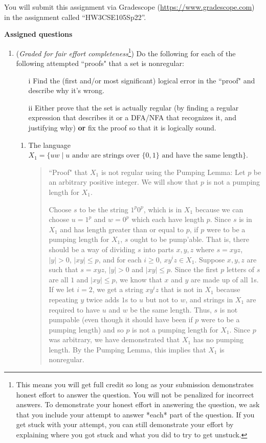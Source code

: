 \instructions

You will submit this assignment via Gradescope
(\href{https://www.gradescope.com}{https://www.gradescope.com}) 
in the assignment called ``HW3CSE105Sp22''.

\newpage
{\bf Assigned questions}
\begin{enumerate}
\item ({\it Graded for fair effort completeness}\footnote{This means 
you will get full credit so long as your submission demonstrates honest 
effort to answer the question. You will not be penalized for incorrect answers. 
To demonstrate your honest effort in answering the question, we ask that you 
include your attempt to answer *each* part of the question. If you get stuck 
with your attempt, you can still demonstrate your effort by explaining where 
you got stuck and what you did to try to get unstuck.})
Do the following for each of the following attempted ``proofs" that  a set is nonregular:
\begin{itemize}
\item[i] Find the (first and/or most significant) logical error in the ``proof" and describe why it's wrong.
\item[ii] Either prove that the set is actually regular (by finding a regular expression that describes it or 
a DFA/NFA that recognizes it, and justifying why) {\bf or} fix the proof so that it is logically sound.
\end{itemize}

\begin{enumerate}
\item The language $X_1 = \{ uw \mid \text{$u$ and
$w$ are strings over $\{0,1\}$ and have the same length} \}$.

\begin{quote}
``Proof" that $X_1$ is not regular using the Pumping Lemma: Let $p$ be 
an arbitrary positive integer. We will show that $p$ is not a pumping length for $X_1$. 

Choose $s$ to be the string $1^p 0^p$, which is in $X_1$ because
we can choose $u = 1^p$ and $w = 0^p$ which each have length $p$.
Since $s$ is in $X_1$ and has length greater than or equal to $p$, if $p$ were to be a
pumping length for $X_1$, $s$ ought to be pump'able. 
That is, there should be a way of dividing $s$ into parts $x,y,z$ where $s=xyz$,
$|y| >0$, $|xy| \leq p$, and for each $i \geq 0$, $xy^iz \in X_1$.
Suppose $x,y,z$ are such that $s = xyz$, $|y| > 0$ and $|xy| \leq p$.
Since the first $p$ letters of $s$ are all $1$ and $|xy| \leq p$, we know
that $x$ and $y$ are made up of all $1$s.  If we let $i=2$, we get 
a string $xy^iz$ that is not in $X_1$ because repeating $y$ twice adds $1$s to 
$u$ but not to $w$, and strings in $X_1$ are required to have $u$ and $w$ be the same
length. Thus, $s$ is not pumpable (even though it should have been if $p$ were to be a pumping length)
and so $p$ is not a pumping length for $X_1$.  Since $p$ was arbitrary, we have
demonstrated that $X_1$ has no pumping length.  By the Pumping Lemma, this implies that 
$X_1$ is nonregular.
\end{quote}



\end{enumerate}
\end{enumerate}
